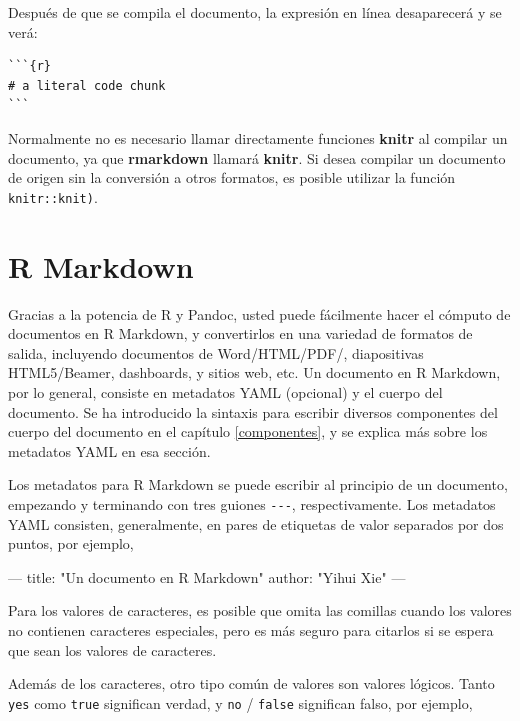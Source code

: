 \documentclass[12pt,]{krantz}
\makeatletter
\newenvironment{Shaded}{\begin{snugshade}}{\end{snugshade}}
\newcommand{\StringTok}[1]{\textcolor[rgb]{0.31,0.60,0.02}{{#1}}}
\newcommand{\OtherTok}[1]{\textcolor[rgb]{0.56,0.35,0.01}{{#1}}}
\newcommand{\FunctionTok}[1]{\textcolor[rgb]{0.00,0.00,0.00}{{#1}}}
\newenvironment{kframe}{%
\medskip{}
\setlength{\fboxsep}{.8em}
 \def\at@end@of@kframe{}%
 \ifinner\ifhmode%
  \def\at@end@of@kframe{\end{minipage}}%
  \begin{minipage}{\columnwidth}%
 \fi\fi%
 \def\FrameCommand##1{\hskip\@totalleftmargin \hskip-\fboxsep
 \colorbox{shadecolor}{##1}\hskip-\fboxsep
     \hskip-\linewidth \hskip-\@totalleftmargin \hskip\columnwidth}%
 \MakeFramed {\advance\hsize-\width
   \@totalleftmargin\z@ \linewidth\hsize
   \@setminipage}}%
 {\par\unskip\endMakeFramed%
 \at@end@of@kframe}
\renewenvironment{Shaded}{\begin{kframe}}{\end{kframe}}
\theoremstyle{definition}
\theoremstyle{definition}
\theoremstyle{remark}
\makeatother
\begin{document}
Después de que se compila el documento, la expresión en línea
desaparecerá y se verá:

\begin{verbatim}
```{r}
# a literal code chunk
```
\end{verbatim}

Normalmente no es necesario llamar directamente funciones \textbf{knitr}
al compilar un documento, ya que \textbf{rmarkdown} llamará
\textbf{knitr}. Si desea compilar un documento de origen sin la
conversión a otros formatos, es posible utilizar la función
\texttt{knitr::knit)}.

\section{R Markdown}\label{r-markdown}

Gracias a la potencia de R y Pandoc, usted puede fácilmente hacer el
cómputo de documentos en R Markdown, y convertirlos en una variedad de
formatos de salida, incluyendo documentos de Word/HTML/PDF/,
diapositivas HTML5/Beamer, dashboards, y sitios web, etc. Un documento
en R Markdown, por lo general, consiste en metadatos YAML
(opcional) y el cuerpo del documento. Se ha introducido la sintaxis para
escribir diversos componentes del cuerpo del documento en el capítulo
\ref{componentes}, y se explica más sobre los metadatos YAML en esa
sección.

Los metadatos para R Markdown se puede escribir al principio de un
documento, empezando y terminando con tres guiones \texttt{-\/-\/-},
respectivamente. Los metadatos YAML consisten, generalmente, en pares de
etiquetas de valor separados por dos puntos, por ejemplo,

\begin{Shaded}
\begin{Highlighting}[]
\OtherTok{---}
\FunctionTok{title:} \StringTok{"Un documento en R Markdown"}
\FunctionTok{author:} \StringTok{"Yihui Xie"}
\OtherTok{---}
\end{Highlighting}
\end{Shaded}

Para los valores de caracteres, es posible que omita las comillas cuando
los valores no contienen caracteres especiales, pero es más seguro para
citarlos si se espera que sean los valores de caracteres.

Además de los caracteres, otro tipo común de valores son valores
lógicos. Tanto \texttt{yes} como \texttt{true} significan verdad, y
\texttt{no} / \texttt{false} significan falso, por ejemplo,
\end{document}
